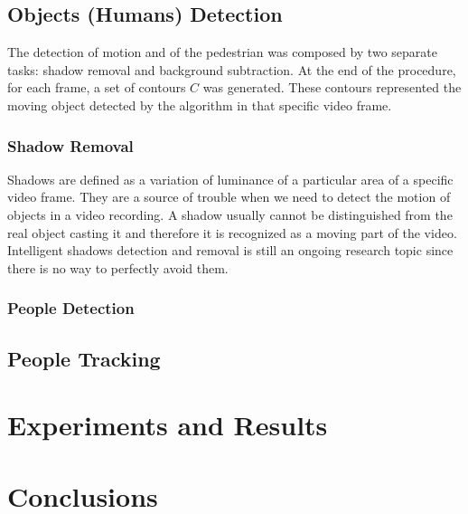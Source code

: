 \documentclass[runningheads]{llncs}
\begin{document}
\subsection{Objects (Humans) Detection}
The detection of motion and of the pedestrian was composed by two separate tasks: shadow removal and background subtraction.
At the end of the procedure, for each frame, a set of contours $C$ was generated. These contours represented the moving object detected
by the algorithm in that specific video frame. 

\subsubsection{Shadow Removal}

Shadows are defined as a variation of luminance of a particular area of a specific video frame. They are a source of trouble when we need to detect the motion of objects in a video recording. A shadow usually cannot be distinguished from the real object casting it and therefore it is recognized as a moving part of the video. Intelligent shadows detection and removal is still an ongoing research topic since there is no way to perfectly avoid them.  

\subsubsection{People Detection}
\subsection{People Tracking}
\section{Experiments and Results}
\section{Conclusions}
\end{document}

